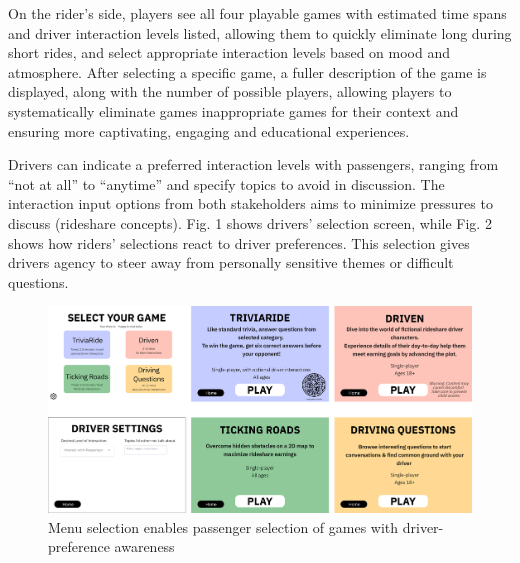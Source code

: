 On the rider’s side, players see all four playable games with estimated time spans and driver interaction levels listed, allowing them to quickly eliminate long during short rides, and select appropriate interaction levels based on mood and atmosphere. 
After selecting a specific game, a fuller description of the game is displayed, along with the number of possible players, allowing players to systematically eliminate games inappropriate games for their context and ensuring more captivating, engaging and educational experiences. 

Drivers can indicate a preferred interaction levels with passengers, ranging from ``not at all'' to ``anytime'' and specify topics to avoid in discussion. The interaction input options from both stakeholders aims to minimize pressures to discuss (rideshare concepts). Fig. 1 shows drivers' selection screen, while Fig. 2 shows how riders’ selections react to driver preferences. 
This selection gives drivers agency to steer away from personally sensitive themes or difficult questions.

\FloatBarrier
\begin{figure}[h!]
    \centering
\includegraphics[width=.9\linewidth]{Chapters/figures/menu.png}
    \caption{Menu selection enables passenger selection of games with driver-preference awareness}
    \label{menu}
\end{figure}
\FloatBarrier

